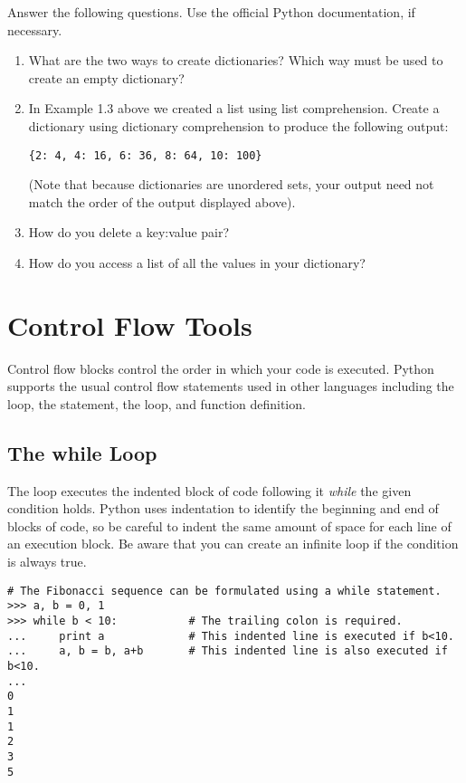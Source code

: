 \begin{problem}
Answer the following questions. Use the official Python documentation, if necessary.
\begin{enumerate}
\item What are the two ways to create dictionaries? Which way must be used to
create an empty dictionary?
\item In Example 1.3 above we created a list using list comprehension. Create a dictionary using dictionary comprehension to produce the following output:

\begin{lstlisting}
{2: 4, 4: 16, 6: 36, 8: 64, 10: 100}
\end{lstlisting}

(Note that because dictionaries are unordered sets, your output need not match the 
order of the output displayed above).
\item How do you delete a key:value pair?
\item How do you access a list of all the values in your dictionary? 

\end{enumerate}
\end{problem}


\section*{Control Flow Tools}

Control flow blocks control the order in which your code is executed.
Python supports the usual control flow statements used in other languages
including the  loop, the  statement, the  loop, 
and function definition. 

\subsection*{The while Loop}
\begin{example}

The  loop executes the indented block of code following it \emph{while} the given condition holds. Python uses indentation to identify the beginning and end of blocks of code, so be careful to indent the same amount of space for each line of an execution block.
Be aware that you can create an infinite loop if the condition is always true.

\begin{lstlisting}
# The Fibonacci sequence can be formulated using a while statement. 
>>> a, b = 0, 1
>>> while b < 10:           # The trailing colon is required.
...     print a             # This indented line is executed if b<10.
...     a, b = b, a+b       # This indented line is also executed if b<10.
...     
0
1
1
2
3
5
\end{lstlisting}
\end{example}

